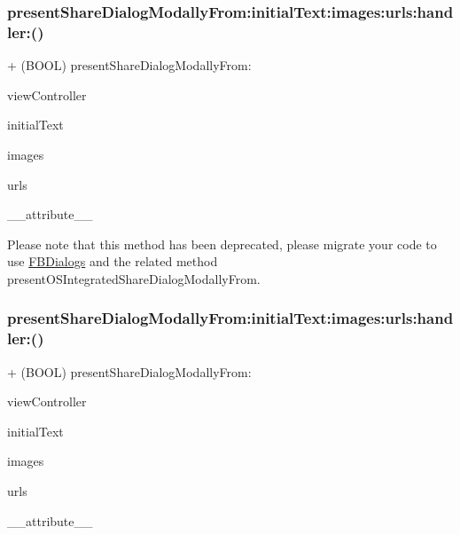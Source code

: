 \subsubsection{\texorpdfstring{present\+Share\+Dialog\+Modally\+From\+:initial\+Text\+:images\+:urls\+:handler\+:()}{presentShareDialogModallyFrom:initialText:images:urls:handler:()}\hspace{0.1cm}{\footnotesize\ttfamily [1/5]}}
{\footnotesize\ttfamily + (B\+O\+OL) present\+Share\+Dialog\+Modally\+From\+: \begin{DoxyParamCaption}\item[{(U\+I\+View\+Controller $\ast$)}]{view\+Controller }\item[{initialText:(N\+S\+String $\ast$)}]{initial\+Text }\item[{images:(N\+S\+Array $\ast$)}]{images }\item[{urls:(N\+S\+Array $\ast$)}]{urls }\item[{handler:((deprecated))}]{\+\_\+\+\_\+attribute\+\_\+\+\_\+ }\end{DoxyParamCaption}}

Please note that this method has been deprecated, please migrate your code to use {\ttfamily \hyperlink{interfaceFBDialogs}{F\+B\+Dialogs}} and the related method {\ttfamily present\+O\+S\+Integrated\+Share\+Dialog\+Modally\+From}. \mbox{\label{interfaceFBNativeDialogs_a0b1838513861cd340a972af6cc612ca5}} 
\subsubsection{\texorpdfstring{present\+Share\+Dialog\+Modally\+From\+:initial\+Text\+:images\+:urls\+:handler\+:()}{presentShareDialogModallyFrom:initialText:images:urls:handler:()}\hspace{0.1cm}{\footnotesize\ttfamily [2/5]}}
{\footnotesize\ttfamily + (B\+O\+OL) present\+Share\+Dialog\+Modally\+From\+: \begin{DoxyParamCaption}\item[{(U\+I\+View\+Controller $\ast$)}]{view\+Controller }\item[{initialText:(N\+S\+String $\ast$)}]{initial\+Text }\item[{images:(N\+S\+Array $\ast$)}]{images }\item[{urls:(N\+S\+Array $\ast$)}]{urls }\item[{handler:((deprecated))}]{\+\_\+\+\_\+attribute\+\_\+\+\_\+ }\end{DoxyParamCaption}}


